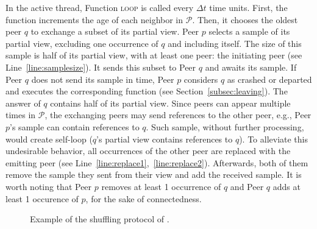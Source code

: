 In the active thread, Function \textsc{loop} is called every $\Delta t$ time
units. First, the function increments the age of each neighbor in
$\mathcal{P}$. Then, it chooses the oldest peer $q$ to exchange a subset of its
partial view.  Peer $p$ selects a sample of its partial view, excluding one
occurrence of $q$ and including itself. The size of this sample is half of its
partial view, with at least one peer: the initiating peer (see
Line~\ref{line:samplesize}).  It sends this subset to Peer $q$ and awaits its
sample. If Peer $q$ does not send its sample in time, Peer $p$ considers $q$ as
crashed or departed and executes the corresponding function (see
Section~\ref{subsec:leaving}). The answer of $q$ contains half of its partial
view. Since peers can appear multiple times in $\mathcal{P}$, the exchanging
peers may send references to the other peer, e.g., Peer $p$'s sample can contain
references to $q$. Such sample, without further processing, would create
self-loop ($q$'s partial view contains references to $q$). To alleviate this
undesirable behavior, all occurrences of the other peer are replaced with the
emitting peer (see Line~\ref{line:replace1},~\ref{line:replace2}).  Afterwards,
both of them remove the sample they sent from their view and add the received
sample. It is worth noting that Peer $p$ removes at least 1 occurrence of $q$
and Peer $q$ adds at least 1 occurence of $p$, for the sake of connectedness.



\begin{figure*}
  \centering
  \hspace{10pt}
  \hspace{10pt}
  \caption{\label{fig:cyclicexample}Example of the shuffling
    protocol of \SPRAY. }
\end{figure*}

